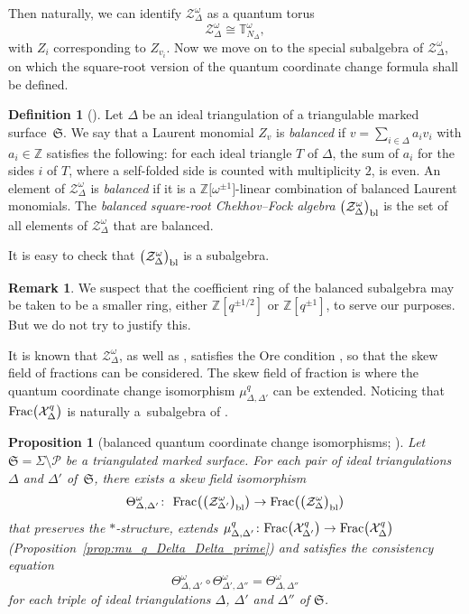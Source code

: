 \documentclass[pdftex]{sigma}
\numberwithin{equation}{section}
\newtheorem{Proposition}[Theorem]{Proposition}
\theoremstyle{definition}
\newtheorem{Definition}[Theorem]{Definition}
\newtheorem{Remark}[Theorem]{Remark}
\begin{document}
Then naturally, we can identify $\mathcal{Z}^\omega_\Delta$ as a quantum torus
\[
\mathcal{Z}^\omega_\Delta \cong \mathbb{T}^\omega_{N_\Delta},
\]
with $Z_i$ corresponding to $Z_{v_i}$.
Now we move on to the special subalgebra of $\mathcal{Z}^\omega_\Delta$, on which the square-root version of the quantum coordinate change formula shall be defined.
\begin{Definition}[\cite{BW, Hiatt}]\label{def:balanced_algebra}
Let $\Delta$ be an ideal triangulation of a triangulable marked surface~$\mathfrak{S}$. We say that a Laurent monomial $Z_v$ is {\em balanced} if $v = \sum_{i \in \Delta} a_i v_i$ with $a_i \in \mathbb{Z}$ satisfies the following: for each ideal triangle $T$ of $\Delta$, the sum of $a_i$ for the sides $i$ of $T$, where a self-folded side is counted with multiplicity $2$, is even.
An element of $\mathcal{Z}^\omega_\Delta$ is {\em balanced} if it is a $\mathbb{Z}\bigl[\omega^{\pm 1}\bigr]$-linear combination of balanced Laurent monomials.
The {\em balanced square-root Chekhov--Fock algebra} $\bigl(\mathcal{Z}^\omega_\Delta\bigr)_{\rm bl}$ is the set of all elements of $\mathcal{Z}^\omega_\Delta$ that are balanced.
\end{Definition}
It is easy to check that $\bigl(\mathcal{Z}^\omega_\Delta\bigr)_{\rm bl}$ is a subalgebra.
\begin{Remark}
We suspect that the coefficient ring of the balanced subalgebra  may be taken to be a smaller ring, either $\mathbb{Z}[q^{\pm 1/2}]$ or $\mathbb{Z}[q^{\pm 1}]$, to serve our purposes. But we do not try to justify this.
\end{Remark}
It is known that $\mathcal{Z}^\omega_\Delta$, as well as , satisfies the Ore condition \cite{Cohn, KLS}, so that the skew field of fractions can be considered. The skew field of fraction  is where the quantum coordinate change isomorphism $\mu^q_{\Delta,\Delta'}$ can be extended. Noticing that ${\rm Frac}\bigl(\mathcal{X}^q_\Delta\bigr)$ is naturally a~subalgebra of .
\begin{Proposition}[balanced quantum coordinate change isomorphisms; \cite{BW, Hiatt,KLS,Son}]
\label{prop:Theta}
Let $\mathfrak{S}= \Sigma\setminus\mathcal{P}$ be a triangulated marked surface. For each pair of ideal triangulations $\Delta$ and $\Delta'$ of~$\mathfrak{S}$, there exists a skew field isomorphism
\[
\Theta^\omega_{\Delta,\Delta'} \colon \ {\rm Frac}\bigl(\bigl(\mathcal{Z}^\omega_{\Delta'}\bigr)_{\rm bl}\bigr) \to {\rm Frac}\bigl(\bigl(\mathcal{Z}^\omega_\Delta\bigr)_{\rm bl}\bigr)
\]
that preserves the $*$-structure, extends $\mu^q_{\Delta,\Delta'} \colon {\rm Frac}\bigl(\mathcal{X}^q_{\Delta'}\bigr) \to {\rm Frac}\bigl(\mathcal{X}^q_\Delta\bigr)$ (Proposition~\ref{prop:mu_q_Delta_Delta_prime}) and satisfies the consistency equation
\[
\Theta^\omega_{\Delta,\Delta'} \circ \Theta^\omega_{\Delta',\Delta''} = \Theta^\omega_{\Delta,\Delta''}
\]
for each triple of ideal triangulations $\Delta$, $\Delta'$ and $\Delta''$ of $\mathfrak{S}$.
\end{Proposition}
\end{document}
